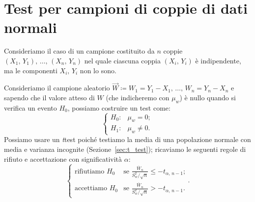    \section{Test per campioni di coppie di dati normali}
        \begin{defn}
            Consideriamo il caso di un campione costituito da $n$ coppie \\
            $(X_1,\,Y_1),\, \ldots,\, (X_n,\,Y_n)$ nel quale ciascuna coppia $(X_i,\,Y_i)$ è indipendente, 
            ma le componenti $X_i,\,Y_i$ non lo sono.

            Consideriamo il campione aleatorio $\vec{W} \coloneqq W_1 = Y_1-X_1,\, \ldots,\, W_n=Y_n-X_n$ e 
            sapendo che il valore atteso di $W$ (che indicheremo con $\mu_w$) è nullo quando si verifica 
            un evento $H_0$, possiamo costruire un test come: \[
                \begin{cases}
                    H_0 : & \mu_w = 0; \\
                    H_1 : & \mu_w \neq 0.
                \end{cases}
            \] Possiamo usare un \emph{t}\nbdash test poiché testiamo la media di una popolazione normale con 
            media e varianza incognite (Sezione~\ref{sec:t_test}); ricaviamo le seguenti regole di rifiuto e 
            accettazione con significatività $\alpha$: \[
                \begin{cases}
                    \text{rifiutiamo } H_0 & 
                    \text{se $\frac{\overline{W}_n}{S_w^2 /\sqrt{n}} \leq -t_{\alpha,\, n-1}$;} \\
                    \text{accettiamo } H_0 & 
                    \text{se $\frac{\overline{W}_n}{S_w^2 /\sqrt{n}} > -t_{\alpha,\, n-1}$.}
                \end{cases}
            .\] 
        \end{defn}

